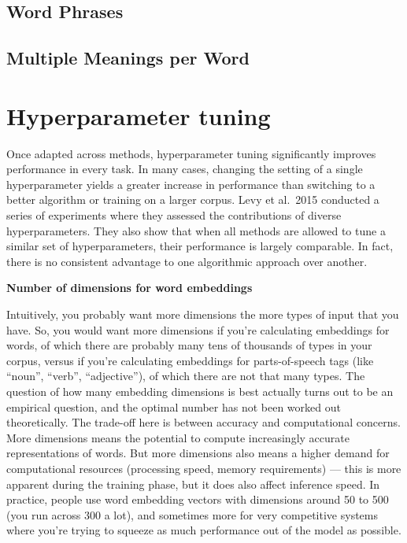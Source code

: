 \documentclass[]{krantz}
\begin{document}
\hypertarget{word-phrases}{%
\subsection{Word Phrases}\label{word-phrases}}

\hypertarget{multiple-meanings-per-word}{%
\subsection{Multiple Meanings per Word}\label{multiple-meanings-per-word}}

\hypertarget{hyperparameter-tuning}{%
\section{Hyperparameter tuning}\label{hyperparameter-tuning}}

Once adapted across methods, hyperparameter tuning significantly improves performance in every task. In many cases, changing the setting of a single hyperparameter yields a greater increase in performance than switching to a better algorithm or training on a larger corpus. Levy et al.~2015 conducted a series of experiments where they assessed the contributions of diverse hyperparameters. They also show that when all methods are allowed to tune a similar set of hyperparameters, their performance is largely comparable. In fact, there is no consistent advantage to one algorithmic approach over another.

\textbf{Number of dimensions for word embeddings}

Intuitively, you probably want more dimensions the more types of input that you have. So, you would want more dimensions if you're calculating embeddings for words, of which there are probably many tens of thousands of types in your corpus, versus if you're calculating embeddings for parts-of-speech tags (like ``noun'', ``verb'', ``adjective''), of which there are not that many types. The question of how many embedding dimensions is best actually turns out to be an empirical question, and the optimal number has not been worked out theoretically. The trade-off here is between accuracy and computational concerns.
More dimensions means the potential to compute increasingly accurate representations of words. But more dimensions also means a higher demand for computational resources (processing speed, memory requirements) --- this is more apparent during the training phase, but it does also affect inference speed.
In practice, people use word embedding vectors with dimensions around 50 to 500 (you run across 300 a lot), and sometimes more for very competitive systems where you're trying to squeeze as much performance out of the model as possible.
\end{document}
